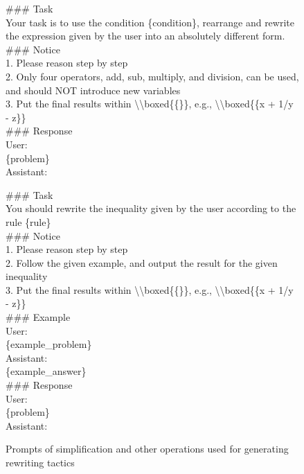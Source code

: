 \begin{figure}[ht]
{\small
\begin{tcolorbox}[colframe=black!75!white, colback=gray!10!white, boxsep=2.5pt, top=5pt, bottom=5pt, left=5pt, right=5pt, title={Prompts of Rewriting Tactics Generation (Simplification)}]  
\#\#\# Task\\
Your task is to use the condition \{condition\}, rearrange and rewrite the expression given by the user into an absolutely different form.\\
\#\#\# Notice\\
1. Please reason step by step\\
2. Only four operators, add, sub, multiply, and division, can be used, and should NOT introduce new variables\\
3. Put the final results within \textbackslash\textbackslash boxed\{\{\}\}, e.g., \textbackslash\textbackslash boxed\{\{x + 1/y - z\}\}\\
\#\#\# Response\\
User: \\
\{problem\}\\
Assistant:
\end{tcolorbox}

\begin{tcolorbox}[colframe=black!75!white, colback=gray!10!white, boxsep=2.5pt, top=5pt, bottom=5pt, left=5pt, right=5pt, title={Prompts of Rewriting Tactics Generation (Others)}]  
\#\#\# Task\\
You should rewrite the inequality given by the user according to the rule \{rule\}\\
\#\#\# Notice\\
1. Please reason step by step\\
2. Follow the given example, and output the result for the given inequality\\
3. Put the final results within \textbackslash\textbackslash boxed\{\{\}\}, e.g., \textbackslash\textbackslash boxed\{\{x + 1/y - z\}\}\\
\#\#\# Example\\
User:\\
\{example\_problem\} \\
Assistant:\\
\{example\_answer\}\\
\#\#\# Response\\
User:\\
\{problem\}\\
Assistant:
\end{tcolorbox}
}
\vspace{-0.75em}
\caption{Prompts of simplification and other operations used for generating rewriting tactics}
\vspace{-1em}
\label{fig:rewriting_tactic}
\end{figure}

